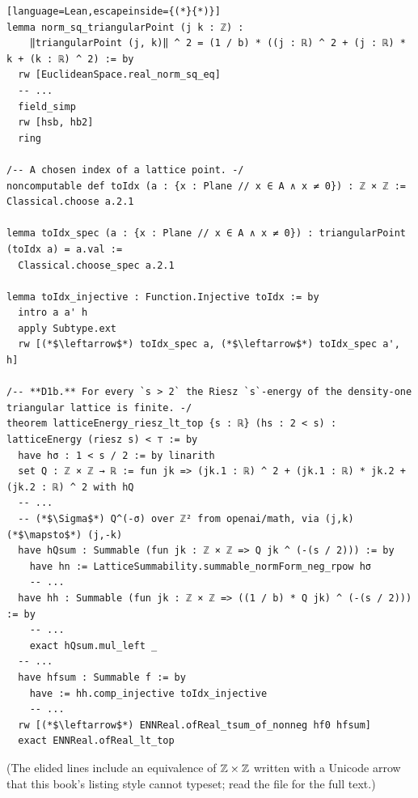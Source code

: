 \begin{leanbox}
\begin{lstlisting}[language=Lean,escapeinside={(*}{*)}]
lemma norm_sq_triangularPoint (j k : ℤ) :
    ‖triangularPoint (j, k)‖ ^ 2 = (1 / b) * ((j : ℝ) ^ 2 + (j : ℝ) * k + (k : ℝ) ^ 2) := by
  rw [EuclideanSpace.real_norm_sq_eq]
  -- ...
  field_simp
  rw [hsb, hb2]
  ring

/-- A chosen index of a lattice point. -/
noncomputable def toIdx (a : {x : Plane // x ∈ A ∧ x ≠ 0}) : ℤ × ℤ := Classical.choose a.2.1

lemma toIdx_spec (a : {x : Plane // x ∈ A ∧ x ≠ 0}) : triangularPoint (toIdx a) = a.val :=
  Classical.choose_spec a.2.1

lemma toIdx_injective : Function.Injective toIdx := by
  intro a a' h
  apply Subtype.ext
  rw [(*$\leftarrow$*) toIdx_spec a, (*$\leftarrow$*) toIdx_spec a', h]

/-- **D1b.** For every `s > 2` the Riesz `s`-energy of the density-one triangular lattice is finite. -/
theorem latticeEnergy_riesz_lt_top {s : ℝ} (hs : 2 < s) : latticeEnergy (riesz s) < ⊤ := by
  have hσ : 1 < s / 2 := by linarith
  set Q : ℤ × ℤ → ℝ := fun jk => (jk.1 : ℝ) ^ 2 + (jk.1 : ℝ) * jk.2 + (jk.2 : ℝ) ^ 2 with hQ
  -- ...
  -- (*$\Sigma$*) Q^(-σ) over ℤ² from openai/math, via (j,k) (*$\mapsto$*) (j,-k)
  have hQsum : Summable (fun jk : ℤ × ℤ => Q jk ^ (-(s / 2))) := by
    have hn := LatticeSummability.summable_normForm_neg_rpow hσ
    -- ...
  have hh : Summable (fun jk : ℤ × ℤ => ((1 / b) * Q jk) ^ (-(s / 2))) := by
    -- ...
    exact hQsum.mul_left _
  -- ...
  have hfsum : Summable f := by
    have := hh.comp_injective toIdx_injective
    -- ...
  rw [(*$\leftarrow$*) ENNReal.ofReal_tsum_of_nonneg hf0 hfsum]
  exact ENNReal.ofReal_lt_top
\end{lstlisting}
\end{leanbox}
(The elided lines include an equivalence of $\mathbb{Z}\times\mathbb{Z}$ written with a Unicode arrow that this book's listing style
cannot typeset; read the file for the full text.)

